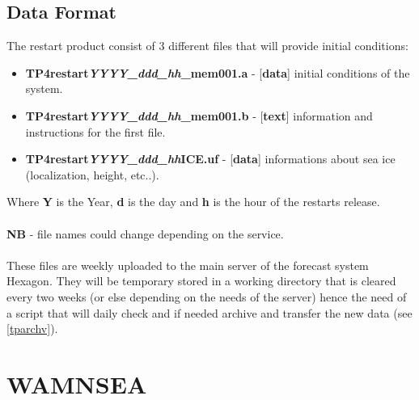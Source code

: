 \documentclass[12pt,a4paper]{report}
\begin{document}
\subsection{Data Format}
The restart product consist of 3 different files that will provide initial conditions: \\
\begin{itemize}
\item \textbf{TP4restart\textit{YYYY\_ddd\_hh}\_mem001.a} - [\textbf{data}] initial conditions of the system.
\item \textbf{TP4restart\textit{YYYY\_ddd\_hh}\_mem001.b} - [\textbf{text}] information and instructions for the first file.
\item \textbf{TP4restart\textit{YYYY\_ddd\_hh}ICE.uf} - [\textbf{data}] informations about sea ice (localization, height, etc..).
\end{itemize}
Where \textbf{Y} is the Year, \textbf{d} is the day and \textbf{h} is the hour of the restarts release. \\ \\
\textbf{NB} - file names could change depending on the service.
\\ \\
These files are weekly uploaded to the main server of the forecast system Hexagon. They will be temporary stored in a working directory that is cleared every two weeks (or else depending on the needs of the server) hence the need of a script that will daily check and if needed archive and transfer the new data (see \ref{tparchv}).

\section{WAMNSEA}
\end{document}
